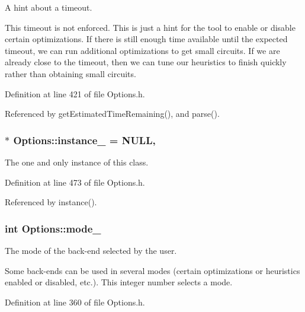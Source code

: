 A hint about a timeout. 

This timeout is not enforced. This is just a hint for the tool to enable or disable certain optimizations. If there is still enough time available until the expected timeout, we can run additional optimizations to get small circuits. If we are already close to the timeout, then we can tune our heuristics to finish quickly rather than obtaining small circuits. 

Definition at line 421 of file Options.\-h.



Referenced by get\-Estimated\-Time\-Remaining(), and parse().

\hypertarget{classOptions_a9097fb97d94616d9166bc7e8df97a58a}{
\subsubsection[{instance\-\_\-}]{ $\ast$ Options\-::instance\-\_\- = N\-U\-L\-L\hspace{0.3cm}{\ttfamily [static]}, {\ttfamily [private]}}}\label{classOptions_a9097fb97d94616d9166bc7e8df97a58a}


The one and only instance of this class. 



Definition at line 473 of file Options.\-h.



Referenced by instance().

\hypertarget{classOptions_a4554d07501f73bbccb9e2628016f2d20}{
\subsubsection[{mode\-\_\-}]{\setlength{\rightskip}{0pt plus 5cm}int Options\-::mode\-\_\-\hspace{0.3cm}{\ttfamily [protected]}}}\label{classOptions_a4554d07501f73bbccb9e2628016f2d20}


The mode of the back-\/end selected by the user. 

Some back-\/ends can be used in several modes (certain optimizations or heuristics enabled or disabled, etc.). This integer number selects a mode. 

Definition at line 360 of file Options.\-h.



